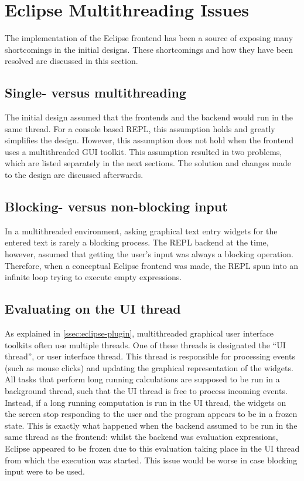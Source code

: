 \section{Eclipse Multithreading Issues}
\label{sec:eclipse-multithread}

The implementation of the Eclipse frontend has been a source of exposing many
shortcomings in the initial designs. These shortcomings and how they have been
resolved are discussed in this section.

\subsection{Single- versus multithreading}

The initial design assumed that the frontends and the backend would run in the
same thread. For a console based REPL, this assumption holds and greatly
simplifies the design. However, this assumption does not hold when the frontend 
uses a multithreaded GUI toolkit. This
assumption resulted in two problems, which are listed separately in the next
sections. The solution and changes made to the design are discussed
afterwards.

\subsection{Blocking- versus non-blocking input}

In a multithreaded environment, asking graphical text entry widgets for the
entered text is rarely a blocking process. The REPL backend at the time,
however, assumed that getting the user's input was always a blocking operation.
Therefore, when a conceptual Eclipse frontend was made, the REPL spun into an
infinite loop trying to execute empty expressions.

\subsection{Evaluating on the UI thread}

As explained in \cref{ssec:eclipse-plugin}, multithreaded graphical user
interface toolkits often use multiple threads. One of these threads is
designated the ``UI thread'', or user interface thread. This thread is
responsible for processing events (such as mouse clicks) and updating the
graphical representation of the widgets. All tasks that perform long running
calculations are supposed to be run in a background thread, such that the UI
thread is free to process incoming events. Instead, if a long running
computation is run in the UI thread, the widgets on the screen stop responding
to the user and the program appears to be in a frozen state. This is exactly
what happened when the backend assumed to be run in the same thread as the
frontend: whilst the backend was evaluation expressions, Eclipse appeared to be
frozen due to this evaluation taking place in the UI thread from which the
execution was started. This issue would be worse in case blocking input
were to be used.

